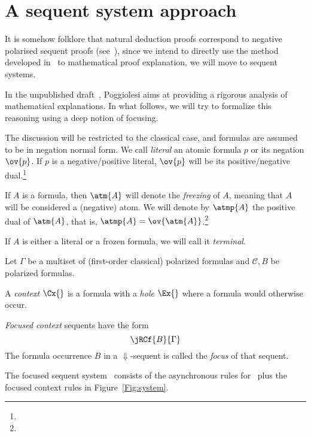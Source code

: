 \documentclass{llncs}
\begin{document}
\section{A sequent system approach} 
It is somehow folklore that natural deduction proofs correspond to negative polarised sequent proofs (see~\cite{DBLP:journals/entcs/PimentelNN16}), since we intend to directly use the method developed in~\cite{DBLP:journals/apal/MarinMPV22} to mathematical proof explanation, we will move to sequent systems.



In the unpublished draft~\cite{francesca}, Poggiolesi aims at providing a rigorous analysis of mathematical explanations. In what follows, we will try to formalize this reasoning using a deep notion of focusing. 

The discussion will be restricted to the classical case, and formulas are assumed to be in negation normal form. We call {\em literal} an atomic formula $p$ or its negation $\ov{p}$. If $p$ is a negative/positive literal, $\ov{p}$ will be its positive/negative dual.\footnote{}

If $A$ is a formula, then $\atm{A}$ will denote the {\em freezing} of $A$, meaning that $A$ will be considered a (negative) atom. We will denote by $\atmp{A}$ the positive dual of $\atm{A}$, that is, $\atmp{A}=\ov{\atm{A}}$.\footnote{}

If $A$ is either a literal or a frozen formula, we will call it {\em terminal}.
\begin{definition}\label{def:seq}
Let $\Gamma$ be a multiset of (first-order classical) polarized formulas and $\mathcal{C}, B$ be polarized formulas. 

A {\em context} $\Cx{}$ is a formula with a \emph{hole} $\Ex{}$ where a formula would otherwise occur. 

{\em Focused context} sequents have the form
\[
  \jRCf{B}{\Gamma}
\]
The formula occurrence $B$ in a $\Downarrow$-sequent is called the
\emph{focus} of that sequent.
\end{definition}

The focused sequent system \LCF\  consists of the asynchronous rules for  \LKF\  plus the focused context rules in Figure~\ref{Fig:system}.
\end{document}
